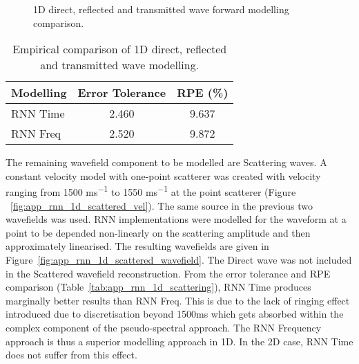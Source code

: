 \begin{figure}[!ht]
	\centering
	\caption[1D direct, reflected and transmitted wave forward modelling comparison.]{1D direct, reflected and transmitted wave forward modelling comparison.}        
	\label{fig:app_rnn_1d_direct_refl_transmitted}
\end{figure}

\begin{table*}[!ht]
        \footnotesize
        \centering
        \begin{tabular}{@{}lcc@{}}\toprule
Modelling  & Error Tolerance    & RPE (\%) \\ \hline
RNN Time   & 2.460 & 9.637                           \\
RNN Freq   & 2.520 & 9.872                           \\ \hline
        \end{tabular}
        \caption{Empirical comparison of 1D direct, reflected and transmitted wave modelling.}\label{tab:app_rnn_1d_direct_refl_transmitted}
\end{table*}

The remaining wavefield component to be modelled are Scattering waves. A constant velocity model with one-point scatterer was created with velocity ranging from 1500 \si{ms^{-1}} to 1550 \si{ms^{-1}} at the point scatterer (Figure ~\ref{fig:app_rnn_1d_scattered_vel}). The same source in the previous two wavefields was used. RNN implementations were modelled for the waveform at a point to be depended non-linearly on the scattering amplitude and then approximately linearised. The resulting wavefields are given in Figure~\ref{fig:app_rnn_1d_scattered_wavefield}. The Direct wave was not included in the Scattered wavefield reconstruction. From the error tolerance and RPE comparison (Table~\ref{tab:app_rnn_1d_scattering}), RNN Time produces marginally better results than RNN Freq.
This is due to the lack of ringing effect introduced due to discretisation beyond 1500ms which gets absorbed within the complex component of the pseudo-spectral approach. The RNN Frequency approach is thus a superior modelling approach in 1D. In the 2D case, RNN Time does not suffer from this effect.

